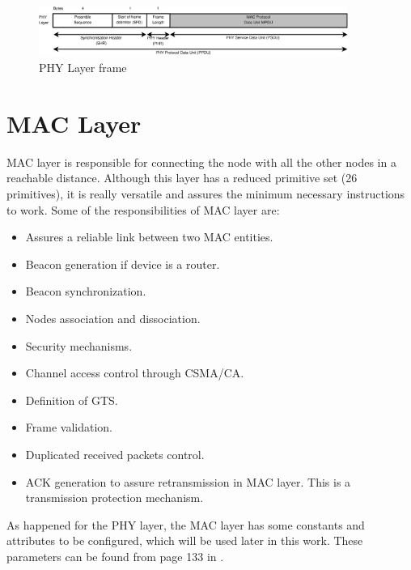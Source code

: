 \begin{itemize}
\vspace*{1cm}

\begin{figure}[ht]
 \begin{center}
  \includegraphics[width=0.9\textwidth]{PPDU.eps}
 \end{center}
 \caption{\ac{PHY} Layer frame \cite{IEEE802.15.4-2006}}
 \label{fig:PPDU}
\end{figure}
\end{itemize}

\section{\ac{MAC} Layer}

\ac{MAC} layer is responsible for connecting the node with all the other nodes in a reachable distance. Although this layer has a reduced
primitive set (26 primitives), it is really versatile and assures the minimum necessary instructions to work. Some of the responsibilities of \ac{MAC}
layer are:

\begin{itemize}
 \item Assures a reliable link between two \ac{MAC} entities.
 \item Beacon generation if device is a router.
 \item Beacon synchronization.
 \item Nodes association and dissociation.
 \item Security mechanisms.
 \item Channel access control through \ac{CSMA/CA}.
 \item Definition of \ac{GTS}.
 \item Frame validation.
 \item Duplicated received packets control.
 \item \ac{ACK} generation to assure retransmission in \ac{MAC} layer. This is a transmission protection mechanism.
\end{itemize}

As happened for the \ac{PHY} layer, the \ac{MAC} layer has some constants and attributes to be configured, which will be used later in this work.
These parameters can be found from page 133 in \cite{IEEE802.15.4-2006}.

